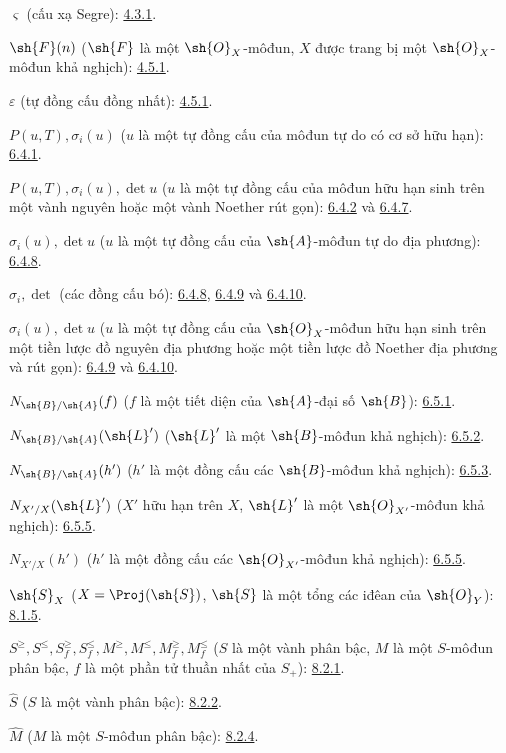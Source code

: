 \documentclass[oneside,10pt]{amsart}
\renewcommand{\leq}{\leqslant}
\renewcommand{\geq}{\geqslant}
\begin{document}
$\varsigma$ (cấu xạ Segre): \hyperref[II.4.3.1]{4.3.1}.

$\sh{F}(n)$ ($\sh{F}$ là một $\sh{O}_X$-môđun, $X$ được trang bị một
$\sh{O}_X$-môđun khả nghịch): \hyperref[II.4.5.1]{4.5.1}.

$\varepsilon$ (tự đồng cấu đồng nhất): \hyperref[II.4.5.1]{4.5.1}.

$P(u,T),\sigma_i(u)$ ($u$ là một tự đồng cấu của môđun tự do có cơ sở hữu hạn): \hyperref[II.6.4.1]{6.4.1}.

$P(u,T),\sigma_i(u),\det u$
($u$ là một tự đồng cấu của môđun hữu hạn sinh trên một vành nguyên hoặc một
vành Noether rút gọn): \hyperref[II.6.4.2]{6.4.2} và \hyperref[II.6.4.7]{6.4.7}.

$\sigma_i(u),\det u$ ($u$ là một tự đồng cấu của $\sh{A}$-môđun tự do địa phương): \hyperref[II.6.4.8]{6.4.8}.

$\sigma_i,\det$ (các đồng cấu bó): \hyperref[II.6.4.8]{6.4.8}, \hyperref[II.6.4.9]{6.4.9} và \hyperref[II.6.4.10]{6.4.10}.

$\sigma_i(u),\det u$
($u$ là một tự đồng cấu của $\sh{O}_X$-môđun hữu hạn sinh trên một tiền lược đồ
nguyên địa phương hoặc một tiền lược đồ Noether địa phương và rút gọn):
\hyperref[II.6.4.9]{6.4.9} và \hyperref[II.6.4.10]{6.4.10}.

$N_{\sh{B}/\sh{A}}(f)$
($f$ là một tiết diện của $\sh{A}$-đại số $\sh{B}$): \hyperref[II.6.5.1]{6.5.1}.

$N_{\sh{B}/\sh{A}}(\sh{L}')$
($\sh{L}'$ là một $\sh{B}$-môđun khả nghịch): \hyperref[II.6.5.2]{6.5.2}.

$N_{\sh{B}/\sh{A}}(h')$
($h'$ là một đồng cấu các $\sh{B}$-môđun khả nghịch): \hyperref[II.6.5.3]{6.5.3}.

$N_{X'/X}(\sh{L}')$
($X'$ hữu hạn trên $X$, $\sh{L}'$ là một $\sh{O}_{X'}$-môđun khả nghịch): \hyperref[II.6.5.5]{6.5.5}.

$N_{X'/X}(h')$
($h'$ là một đồng cấu các $\sh{O}_{X'}$-môđun khả nghịch): \hyperref[II.6.5.5]{6.5.5}.

$\sh{S}_X$ ($X=\Proj(\sh{S})$, $\sh{S}$ là một tổng các iđêan của
$\sh{O}_Y$): \hyperref[II.8.1.5]{8.1.5}.

$S^\geq,S^\leq,S_f^\geq,S_f^\leq,
M^\geq,M^\leq,M_f^\geq,M_f^\leq$
($S$ là một vành phân bậc, $M$ là một $S$-môđun phân bậc,
$f$ là một phần tử thuần nhất của $S_+$): \hyperref[II.8.2.1]{8.2.1}.

$\widehat S$ ($S$ là một vành phân bậc): \hyperref[II.8.2.2]{8.2.2}.

$\widehat M$ ($M$ là một $S$-môđun phân bậc): \hyperref[II.8.2.4]{8.2.4}.
\end{document}

